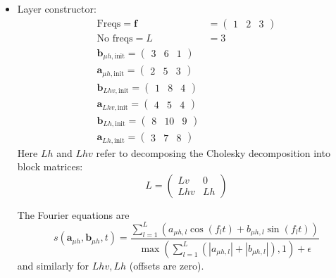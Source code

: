 \documentclass[11pt]{article}
\newcommand{\abf}{\boldsymbol{a}}
\newcommand{\bbf}{\boldsymbol{b}}
\begin{document}
\begin{itemize}

\item Layer constructor:
	\begin{equation}
	\begin{split}
	\text{Freqs} = \boldsymbol{f}
	&=
	\begin{pmatrix}
		1 & 2 & 3
	\end{pmatrix}
	\\
	\text{No freqs} = L &= 3 
	\\
	\bbf_{\mu h, \text{init}} = \begin{pmatrix}
		3 & 6 & 1
	\end{pmatrix}
	\\
	\abf_{\mu h, \text{init}} = \begin{pmatrix}
		2 & 5 & 3
	\end{pmatrix}
	\\
	\bbf_{Lhv, \text{init}} = \begin{pmatrix}
		1 & 8 & 4
	\end{pmatrix}
	\\
	\abf_{Lhv, \text{init}} = \begin{pmatrix}
		4 & 5 & 4
	\end{pmatrix}
	\\
	\bbf_{Lh, \text{init}} = \begin{pmatrix}
		8 & 10 & 9
	\end{pmatrix}
	\\
	\abf_{Lh, \text{init}} = \begin{pmatrix}
		3 & 7 & 8
	\end{pmatrix}
	\end{split}
	\end{equation}
	Here $Lh$ and $Lhv$ refer to decomposing the Cholesky decomposition into block matrices:
	\begin{equation}
	L = \begin{pmatrix}
		Lv & 0 \\
		Lhv & Lh
	\end{pmatrix}
	\end{equation}
	
	The Fourier equations are
	\begin{equation}
	s(\abf_{\mu h}, \bbf_{\mu h}, t) = \frac{
	\sum_{l=1}^L \left ( a_{\mu h,l} \cos(f_l t) + b_{\mu h,l} \sin(f_l t) \right )
	}{
	\max \left ( \sum_{l=1}^L (|a_{\mu h,l}| + |b_{\mu h,l}|), 1 \right ) + \epsilon
	}
	\end{equation}
	and similarly for $Lhv, Lh$ (offsets are zero).


\end{itemize}
\end{document}
